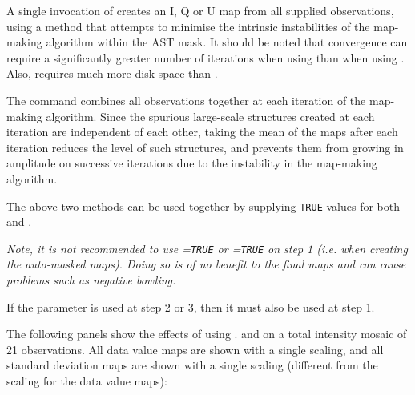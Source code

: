 \begin{enumerate}
A single invocation of  creates an I, Q or U map from all
supplied observations, using a method that attempts to minimise the
intrinsic instabilities of the map-making algorithm within the AST mask.
It should be noted that convergence can require a significantly greater number
of iterations when using  than when using . Also,
 requires much more disk space than .

The  command combines all observations together at each
iteration of the map-making algorithm. Since the spurious large-scale
structures created at each iteration are independent of each other,
taking the mean of the maps after each iteration reduces the level of such
structures, and prevents them from growing in amplitude on successive
iterations due to the instability in the map-making algorithm.

\end{enumerate}

The above two methods can be used together by supplying \texttt{TRUE}
values for both  and .

\begin{center}
\emph{Note, it is not recommended to use =\texttt{TRUE} or
=\texttt{TRUE} on step 1 (i.e. when creating the auto-masked
maps). Doing so is of no benefit to the final maps and can cause problems
such as negative bowling.}
\end{center}

If the  parameter is used at step 2 or 3, then it must
also be used at step 1.

The following panels show the effects of using . and
 on a total intensity mosaic of 21 observations. All
data value maps are shown with a single scaling, and all standard
deviation maps are shown with a single scaling (different from the scaling
for the data value maps):

\newlength{\picwid}
\latexhtml{\setlength{\picwid}{0.3\linewidth}}{\setlength{\picwid}{0.9\linewidth}}


